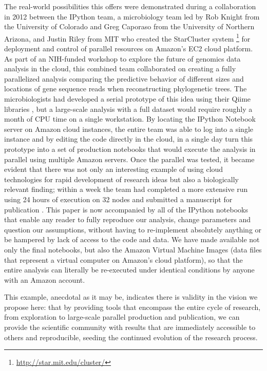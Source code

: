 \documentclass[ChapterTOCs,krantz2]{krantz} %
\begin{document}
The real-world possibilities this offers were demonstrated during a
collaboration in 2012 between the IPython team, a microbiology team led by Rob
Knight from the University of Colorado and Greg Caporaso from the University of
Northern Arizona, and Justin Riley from MIT who created the StarCluster system
\footnote{\url{http://star.mit.edu/cluster/}} for deployment and control of
parallel resources on Amazon's EC2 cloud platform.  As part of an NIH-funded
workshop to explore the future of genomics data analysis in the cloud, this
combined team collaborated on creating a fully parallelized analysis comparing
the predictive behavior of different sizes and locations of gene sequence reads
when reconstructing phylogenetic trees.  The microbiologists had developed a
serial prototype of this idea using their Qiime libraries
\cite{caporaso2010qiime}, but a large-scale analysis with a full dataset would
require roughly a month of CPU time on a single workstation.  By locating the
IPython Notebook server on Amazon cloud instances, the entire team was able to
log into a single instance and by editing the code directly in the cloud, in a
single day turn this prototype into a set of production notebooks that would
execute the analysis in parallel using multiple Amazon servers.  Once the
parallel was tested, it became evident that there was not only an interesting
example of using cloud technologies for rapid development of research ideas but
also a biologically relevant finding; within a week the team had completed a
more extensive run using 24 hours of execution on 32 nodes and submitted a
manuscript for publication \cite{RWM+12}.  This paper is now accompanied by all
of the IPython notebooks that enable any reader to fully reproduce our
analysis, change parameters and question our assumptions, without having to
re-implement absolutely anything or be hampered by lack of access to the code
and data.  We have made available not only the final notebooks, but also the
Amazon Virtual Machine Images (data files that represent a virtual computer on
Amazon's cloud platform), so that the entire analysis can literally be
re-executed under identical conditions by anyone with an Amazon account.

This example, anecdotal as it may be, indicates there is validity in the vision
we propose here: that by providing tools that encompass the entire cycle of
research, from exploration to large-scale parallel production and publication,
we can provide the scientific community with results that are immediately
accessible to others and reproducible, seeding the continued evolution of the
research process.
\end{document}
